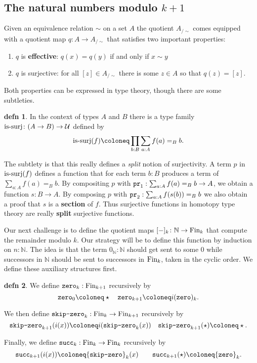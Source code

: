\documentclass{amsart}
\theoremstyle{theorem}
\theoremstyle{definition}
\newtheorem*{defn}{defn}
\theoremstyle{remark}
\newcommand{\0}{\mathbbe{0}}
\newcommand{\1}{\mathbbe{1}}
\newcommand{\2}{\mathbbe{2}}
\newcommand{\3}{\mathbbe{3}}
\newcommand{\4}{\mathbbe{4}}
\newcommand{\term}[1]{{\textup{\texttt{#1}}}}
\newcommand{\type}[1]{{\textup{#1}}}
\newcommand{\bN}{{\mathbb{N}}}
\newcommand{\pr}{\term{pr}}
\newcommand{\UU}{{\mathcal{U}}}
\begin{document}
\subsection*{The natural numbers modulo $k+1$}

Given an equivalence relation $\sim$ on a set $A$ the quotient $A_{/\sim}$ comes equipped with a quotient map $q \colon A \to A_{/\sim}$ that satisfies two important properties:
\begin{enumerate}
\item $q$ is \textbf{effective}: $q(x) = q(y)$ if and only if $x \sim y$
\item $q$ is surjective: for all $[z] \in A_{/\sim}$ there is some $z \in A$ so that $q(z) = [z]$.
\end{enumerate}

Both properties can be expressed in type theory, though there are some subtleties.

\begin{defn} In the context of types $A$ and $B$ there is a type family $\type{is-surj} \colon (A \to B) \to \UU$ defined by
\[ \type{is-surj}(f) \coloneq \prod_{b : B} \sum_{a : A} f(a) =_B b.\]
\end{defn}

The subtlety is that this really defines a \emph{split} notion of surjectivity. A term $p$ in $\type{is-surj}(f)$ defines a function that for each term $b : B$ produces a term of $\sum_{a : A} f(a) =_B b$. By compositing $p$ with $\pr_1 : \sum_{a : A} f(a) =_B b \to A$, we obtain a function $s \colon B \to A$. By composing $p$ with $\pr_2 : \sum_{a : A} f(s(b)) =_B b$ we also obtain a proof that $s$ is a \textbf{section} of $f$. Thus surjective functions in homotopy type theory are really \textbf{split} surjective functions.

Our next challenge is to define the quotient maps $[-]_{k} \colon \bN \to \type{Fin}_{k}$ that compute the remainder modulo $k$. Our strategy will be to define this function by induction on $n : \bN$. The idea is that the term $0_\bN : \bN$ should get sent to some $0$ while successors in $\bN$ should be sent to successors in $\type{Fin}_k$, taken in the cyclic order. We define these auxiliary structures first.

\begin{defn} We define $\term{zero}_k : \type{Fin}_{k+1}$ recursively by
\[ \term{zero}_0 \coloneq \star \quad \term{zero}_{k+1} \coloneq i(\term{zero})_k.\]

We then define $\term{skip-zero}_k : \type{Fin}_k \to \type{Fin}_{k+1}$ recursively by
\[ \term{skip-zero}_{k+1}(i(x)) \coloneq i(\term{skip-zero}_k(x)) \quad \term{skip-zero}_{k+1}(\star) \coloneq \star.\]

Finally, we define $\term{succ}_k : \type{Fin}_k \to \type{Fin}_k$ recursively by
\[ \term{succ}_{k+1}(i(x)) \coloneq \term{skip-zero}_k(x) \qquad \term{succ}_{k+1}(\star) \coloneq \term{zero}_k.\]
\end{defn}
\end{document}
